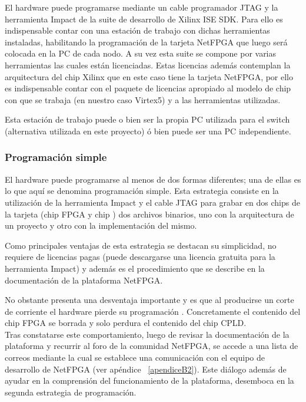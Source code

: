 El hardware puede programarse mediante un cable programador JTAG y la herramienta Impact de la suite de desarrollo de Xilinx ISE SDK. Para ello es indispensable contar con una estaci\'on de trabajo con dichas herramientas instaladas, habilitando la programaci\'on  de la tarjeta NetFPGA que luego ser\'a colocada en la PC de cada nodo. A su vez esta suite se compone por varias herramientas las cuales están licenciadas. Estas licencias adem\'as contemplan la arquitectura del chip Xilinx que en este caso tiene la tarjeta NetFPGA, por ello es indispensable contar con el paquete de licencias apropiado al modelo de chip con que se trabaja (en nuestro caso Virtex5) y a las herramientas utilizadas. 

Esta estaci\'on de trabajo puede o bien ser la propia PC utilizada para el switch (alternativa utilizada en este proyecto) \'o bien puede ser una PC independiente.


\subsubsection{Programaci\'on simple}
El hardware puede programarse al menos de dos formas diferentes; una de ellas es lo que aqu\'i se denomina programaci\'on simple. Esta estrategia consiste en la utilizaci\'on de la herramienta Impact y el cable JTAG para grabar en dos chips de la tarjeta (chip FPGA y chip ) dos archivos binarios, uno con la arquitectura de un proyecto y otro con la implementaci\'on del mismo.

Como principales ventajas de esta estrategia se destacan su simplicidad, no requiere de licencias pagas 
 (puede descargarse una licencia gratuita para la herramienta Impact) y adem\'as es el procedimiento que se describe en la documentaci\'on de la plataforma NetFPGA.

No obstante presenta una desventaja importante y es que al producirse un corte de corriente el hardware pierde su programación . Concretamente el contenido del chip FPGA se borrada y solo perdura el contenido del chip CPLD.\\

Tras constatarse este comportamiento, luego de revisar la documentaci\'on de la plataforma y recurrir al foro de la comunidad NetFPGA, se accede a una lista de correos mediante la cual se establece una comunicaci\'on con el equipo de desarrollo de NetFPGA (ver ap\'endice ~\ref{apendiceB2}). Este di\'alogo adem\'as de ayudar en la comprensión del funcionamiento de la plataforma, desemboca en la segunda estrategia de programaci\'on.

